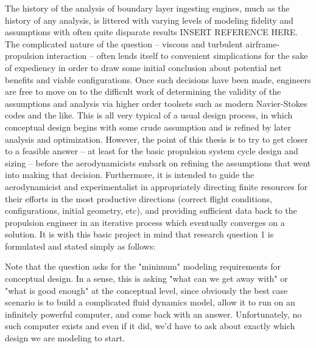 \documentclass[12pt]{gatech-thesis}
\begin{document}
The history of the analysis of boundary layer ingesting engines, much as the history of any analysis, is littered with varying levels of modeling fidelity and assumptions with often quite disparate results INSERT REFERENCE HERE.  The complicated nature of the question -- viscous and turbulent airframe-propulsion interaction -- often lends itself to convenient simplications for the sake of expediency in order to draw some initial conclusion about potential net benefits and viable configurations.  Once such decisions have been made, engineers are free to move on to the difficult work of determining the validity of the assumptions and analysis via higher order toolsets such as modern Navier-Stokes codes and the like.  This is all very typical of a usual design process, in which conceptual design begins with some crude assumption and is refined by later analysis and optimization.  However, the point of this thesis is to try to get closer to a feasible answer -- at least for the basic propulsion system cycle design and sizing -- before the aerodynamicists embark on refining the assumptions that went into making that decision.  Furthermore, it is intended to guide the aerodynamicist and experimentalist in appropriately directing finite resources for their efforts in the most productive directions (correct flight conditions, configurations, initial geometry, etc), and providing sufficient data back to the propulsion engineer in an iterative process which eventually converges on a solution.  It is with this basic project in mind that research question 1 is formulated and stated simply as follows:
\vspace{25pt}
\vspace{5mm}
\vspace{5mm}

Note that the question asks for the "minimum" modeling requirements for conceptual design.  In a sense, this is asking "what can we get away with" or "what is good enough" at the conceptual level, since obviously the best case scenario is to build a complicated fluid dynamics model, allow it to run on an infinitely powerful computer, and come back with an answer.  Unfortunately, no such computer exists and even if it did, we'd have to ask about exactly which design we are modeling to start.
\end{document}

